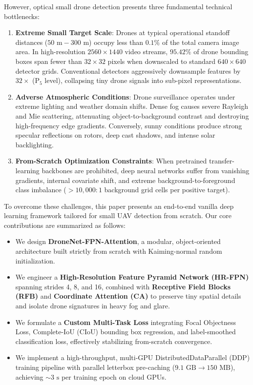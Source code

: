 \documentclass[10pt,conference,letterpaper,twocolumn]{article}
\begin{document}
However, optical small drone detection presents three fundamental technical bottlenecks:
\begin{enumerate}
    \item \textbf{Extreme Small Target Scale}: Drones at typical operational standoff distances ($50\text{ m} - 300\text{ m}$) occupy less than $0.1\%$ of the total camera image area. In high-resolution $2560\times 1440$ video streams, $95.42\%$ of drone bounding boxes span fewer than $32\times 32$ pixels when downscaled to standard $640\times 640$ detector grids. Conventional detectors aggressively downsample features by $32\times$ ($\text{P}_5$ level), collapsing tiny drone signals into sub-pixel representations.
    \item \textbf{Adverse Atmospheric Conditions}: Drone surveillance operates under extreme lighting and weather domain shifts. Dense fog causes severe Rayleigh and Mie scattering, attenuating object-to-background contrast and destroying high-frequency edge gradients. Conversely, sunny conditions produce strong specular reflections on rotors, deep cast shadows, and intense solar backlighting.
    \item \textbf{From-Scratch Optimization Constraints}: When pretrained transfer-learning backbones are prohibited, deep neural networks suffer from vanishing gradients, internal covariate shift, and extreme background-to-foreground class imbalance ($>10,000:1$ background grid cells per positive target).
\end{enumerate}

To overcome these challenges, this paper presents an end-to-end vanilla deep learning framework tailored for small UAV detection from scratch. Our core contributions are summarized as follows:
\begin{itemize}
    \item We design \textbf{DroneNet-FPN-Attention}, a modular, object-oriented architecture built strictly from scratch with Kaiming-normal random initialization.
    \item We engineer a \textbf{High-Resolution Feature Pyramid Network (HR-FPN)} spanning strides 4, 8, and 16, combined with \textbf{Receptive Field Blocks (RFB)} and \textbf{Coordinate Attention (CA)} to preserve tiny spatial details and isolate drone signatures in heavy fog and glare.
    \item We formulate a \textbf{Custom Multi-Task Loss} integrating Focal Objectness Loss, Complete-IoU (CIoU) bounding box regression, and label-smoothed classification loss, effectively stabilizing from-scratch convergence.
    \item We implement a high-throughput, multi-GPU DistributedDataParallel (DDP) training pipeline with parallel letterbox pre-caching ($9.1\text{ GB} \rightarrow 150\text{ MB}$), achieving $\sim 3\text{ s}$ per training epoch on cloud GPUs.
\end{itemize}
\end{document}
